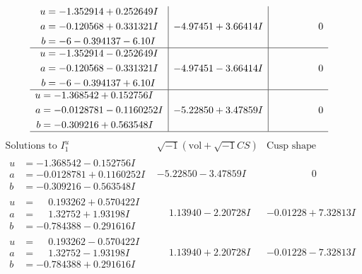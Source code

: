 \documentclass[1p]{elsarticle_modified}
\theoremstyle{definition}
\newcommand{\I}{\sqrt{-1}}
\begin{document}
$$\begin{array}{c|c|c}
\begin{aligned}
u &= -1.352914 + 0.252649 I \\
a &= -0.120568 + 0.331321 I \\
b &=                  -6
-0.394137 - 6. 10   I\end{aligned}
 & -4.97451 + 3.66414 I & \phantom{-0.000000 } 0 \\ \hline\begin{aligned}
u &= -1.352914 - 0.252649 I \\
a &= -0.120568 - 0.331321 I \\
b &=                  -6
-0.394137 + 6. 10   I\end{aligned}
 & -4.97451 - 3.66414 I & \phantom{-0.000000 } 0 \\ \hline\begin{aligned}
u &= -1.368542 + 0.152756 I \\
a &= -0.0128781 - 0.1160252 I \\
b &= -0.309216 + 0.563548 I\end{aligned}
 & -5.22850 + 3.47859 I & \phantom{-0.000000 } 0\\
 \hline 
 \end{array}$$\newpage$$\begin{array}{c|c|c}  
\text{Solutions to }I^u_{1}& \I (\text{vol} + \sqrt{-1}CS) & \text{Cusp shape}\\
 \hline 
\begin{aligned}
u &= -1.368542 - 0.152756 I \\
a &= -0.0128781 + 0.1160252 I \\
b &= -0.309216 - 0.563548 I\end{aligned}
 & -5.22850 - 3.47859 I & \phantom{-0.000000 } 0 \\ \hline\begin{aligned}
u &= \phantom{-}0.193262 + 0.570422 I \\
a &= \phantom{-}1.32752 + 1.93198 I \\
b &= -0.784388 - 0.291616 I\end{aligned}
 & \phantom{-}1.13940 - 2.20728 I & -0.01228 + 7.32813 I \\ \hline\begin{aligned}
u &= \phantom{-}0.193262 - 0.570422 I \\
a &= \phantom{-}1.32752 - 1.93198 I \\
b &= -0.784388 + 0.291616 I\end{aligned}
 & \phantom{-}1.13940 + 2.20728 I & -0.01228 - 7.32813 I \\ \hline\begin{aligned}

\end{aligned}
\end{array}$$
\end{document}
